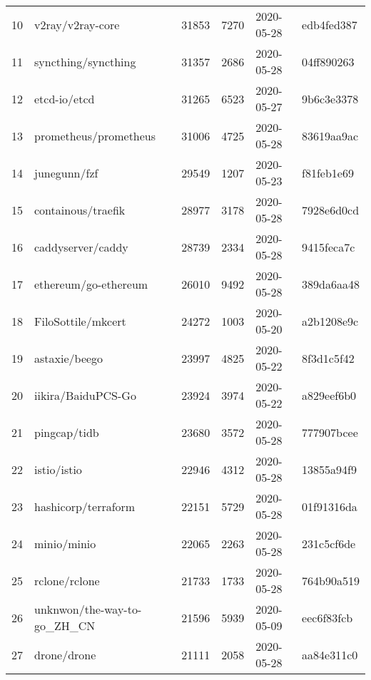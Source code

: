 \begin{longtable}{llrrll}
    10  &                                   v2ray/v2ray-core &  31853 &   7270 & 2020-05-28 &  edb4fed387 \\
    11  &                                syncthing/syncthing &  31357 &   2686 & 2020-05-28 &  04ff890263 \\
    12  &                                       etcd-io/etcd &  31265 &   6523 & 2020-05-27 &  9b6c3e3378 \\
    13  &                              prometheus/prometheus &  31006 &   4725 & 2020-05-28 &  83619aa9ac \\
    14  &                                       junegunn/fzf &  29549 &   1207 & 2020-05-23 &  f81feb1e69 \\
    15  &                                 containous/traefik &  28977 &   3178 & 2020-05-28 &  7928e6d0cd \\
    16  &                                  caddyserver/caddy &  28739 &   2334 & 2020-05-28 &  9415feca7c \\
    17  &                               ethereum/go-ethereum &  26010 &   9492 & 2020-05-28 &  389da6aa48 \\
    18  &                                 FiloSottile/mkcert &  24272 &   1003 & 2020-05-20 &  a2b1208e9c \\
    19  &                                      astaxie/beego &  23997 &   4825 & 2020-05-22 &  8f3d1c5f42 \\
    20  &                                 iikira/BaiduPCS-Go &  23924 &   3974 & 2020-05-22 &  a829eef6b0 \\
    21  &                                       pingcap/tidb &  23680 &   3572 & 2020-05-28 &  777907bcee \\
    22  &                                        istio/istio &  22946 &   4312 & 2020-05-28 &  13855a94f9 \\
    23  &                                hashicorp/terraform &  22151 &   5729 & 2020-05-28 &  01f91316da \\
    24  &                                        minio/minio &  22065 &   2263 & 2020-05-28 &  231c5cf6de \\
    25  &                                      rclone/rclone &  21733 &   1733 & 2020-05-28 &  764b90a519 \\
    26  &                        unknwon/the-way-to-go\_ZH\_CN &  21596 &   5939 & 2020-05-09 &  eec6f83fcb \\
    27  &                                        drone/drone &  21111 &   2058 & 2020-05-28 &  aa84e311c0 \\

\end{longtable}
